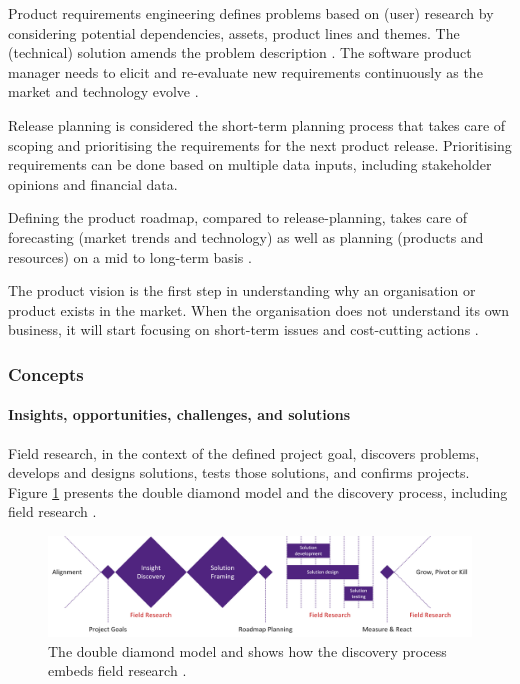 Product requirements engineering defines problems based on (user) research by considering potential dependencies, assets, product lines and themes. The (technical) solution amends the problem description \parencite{PM01}. The software product manager needs to elicit and re-evaluate new requirements continuously as the market and technology evolve \parencite{PM13}.

Release planning is considered the short-term planning process that takes care of scoping and prioritising the requirements for the next product release. Prioritising requirements can be done based on multiple data inputs, including stakeholder opinions \parencite{PM01} and financial data. 

Defining the product roadmap, compared to release-planning, takes care of forecasting (market trends and technology) as well as planning (products and resources) on a mid to long-term basis \parencite{PM01}. 

The product vision is the first step in understanding why an organisation or product exists in the market. When the organisation does not understand its own business, it will start focusing on short-term issues and cost-cutting actions \parencite{PM16}. 

\subsubsection{Concepts} \label{general_concepts}
\paragraph{Insights, opportunities, challenges, and solutions}
Field research, in the context of the defined project goal, discovers problems, develops and designs solutions, tests those solutions, and confirms projects. Figure \ref{fig:ddm} presents the double diamond model and the discovery process, including field research \parencite{OTH02}.

\begin{figure}[H]
\centering
  \includegraphics[width=16cm]{../../Images/DoubleDiamond.png}
  \caption{The double diamond model and shows how the discovery process embeds field research \parencite{OTH02}.}
  \label{fig:ddm}
\end{figure} 

